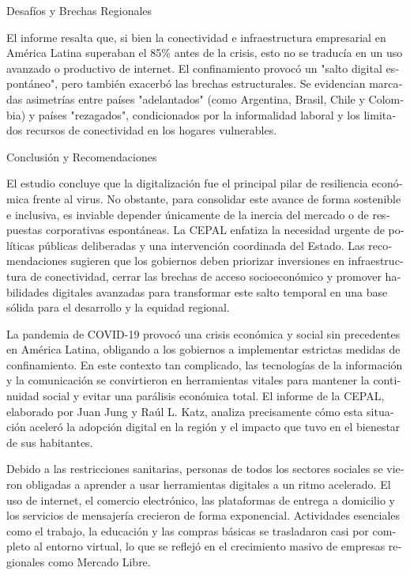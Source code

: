 \begin{tcolorbox}[colback=brown!8!white,colframe=brown!8!white,boxrule=0pt,arc=2pt,left=4pt,right=4pt,top=3pt,bottom=3pt,before skip=4pt,after skip=4pt]
\begin{otherlanguage}{spanish}
Desafíos y Brechas Regionales

El informe resalta que, si bien la conectividad e infraestructura empresarial en América Latina superaban el 85\% antes de la crisis, esto no se traducía en un uso avanzado o productivo de internet. El confinamiento provocó un "salto digital espontáneo", pero también exacerbó las brechas estructurales. Se evidencian marcadas asimetrías entre países "adelantados" (como Argentina, Brasil, Chile y Colombia) y países "rezagados", condicionados por la informalidad laboral y los limitados recursos de conectividad en los hogares vulnerables.

Conclusión y Recomendaciones

El estudio concluye que la digitalización fue el principal pilar de resiliencia económica frente al virus. No obstante, para consolidar este avance de forma sostenible e inclusiva, es inviable depender únicamente de la inercia del mercado o de respuestas corporativas espontáneas. La CEPAL enfatiza la necesidad urgente de políticas públicas deliberadas y una intervención coordinada del Estado. Las recomendaciones sugieren que los gobiernos deben priorizar inversiones en infraestructura de conectividad, cerrar las brechas de acceso socioeconómico y promover habilidades digitales avanzadas para transformar este salto temporal en una base sólida para el desarrollo y la equidad regional.

La pandemia de COVID-19 provocó una crisis económica y social sin precedentes en América Latina, obligando a los gobiernos a implementar estrictas medidas de confinamiento. En este contexto tan complicado, las tecnologías de la información y la comunicación se convirtieron en herramientas vitales para mantener la continuidad social y evitar una parálisis económica total. El informe de la CEPAL, elaborado por Juan Jung y Raúl L. Katz, analiza precisamente cómo esta situación aceleró la adopción digital en la región y el impacto que tuvo en el bienestar de sus habitantes.

Debido a las restricciones sanitarias, personas de todos los sectores sociales se vieron obligadas a aprender a usar herramientas digitales a un ritmo acelerado. El uso de internet, el comercio electrónico, las plataformas de entrega a domicilio y los servicios de mensajería crecieron de forma exponencial. Actividades esenciales como el trabajo, la educación y las compras básicas se trasladaron casi por completo al entorno virtual, lo que se reflejó en el crecimiento masivo de empresas regionales como Mercado Libre.


\end{otherlanguage}
\end{tcolorbox}
